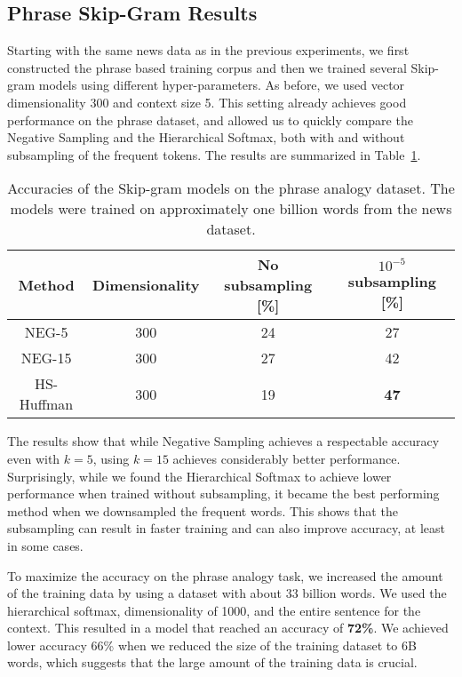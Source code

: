 \documentclass{article}
\begin{document}
\subsection{Phrase Skip-Gram Results}
\label{sec:phrase_results}

Starting with the same news data as in the previous experiments,
we first constructed the phrase based training corpus and then we trained several
Skip-gram models using different hyper-parameters. As before, we used vector
dimensionality 300 and context size 5. This
setting already achieves good performance on the phrase
dataset, and allowed us to quickly compare the Negative Sampling
and the Hierarchical Softmax, both with and without subsampling
of the frequent tokens. The results are summarized in Table~\ref{table:phrase_basic_results}.
\begin{table}[b]
\small
\begin{center}
  \begin{tabular}{|c|c|c|c|}
    \hline
    Method & Dimensionality & No subsampling [\%] & $10^{-5}$ subsampling [\%] \\
    \hline
    NEG-5  &    300         & 24                  & 27                      \\
    NEG-15 &    300         & 27                  & 42                      \\
    HS-Huffman & 300        & 19                  & {\bf 47}                \\
    \hline
  \end{tabular}
\end{center}
\caption{
\label{table:phrase_basic_results}
Accuracies of the Skip-gram models on the phrase analogy dataset. The models were
trained on approximately one billion words from the news dataset.}
\end{table}

The results show that while Negative Sampling achieves a respectable
accuracy even with $k=5$, using $k=15$ achieves considerably better
performance. Surprisingly, while we found the Hierarchical Softmax to
achieve lower performance when trained without subsampling,
it became the best performing method when we
downsampled the frequent words. This shows that the subsampling
can result in faster training and can also improve accuracy, at least in some cases.

To maximize the accuracy on the phrase analogy task, we increased
the amount of the training data by using a dataset with about 33 billion words. We
used the hierarchical softmax, dimensionality of 1000, and
the entire sentence for the context.
This resulted in a model that reached an accuracy of {\bf 72\%}. We achieved lower accuracy
66\% when we reduced the size of the training dataset to 6B words, which suggests
that the large amount of the training data is crucial.
\end{document}
